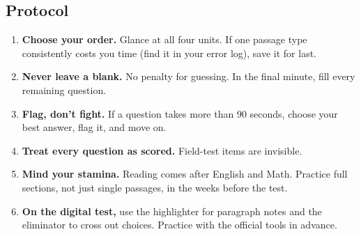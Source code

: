 \documentclass[11pt]{article}
\begin{document}
\subsection{Protocol}
\begin{enumerate}
  \item \textbf{Choose your order.} Glance at all four units. If one passage type consistently costs you time (find it in your error log), save it for last.
  \item \textbf{Never leave a blank.} No penalty for guessing. In the final minute, fill every remaining question.
  \item \textbf{Flag, don't fight.} If a question takes more than 90 seconds, choose your best answer, flag it, and move on.
  \item \textbf{Treat every question as scored.} Field-test items are invisible.
  \item \textbf{Mind your stamina.} Reading comes after English and Math. Practice full sections, not just single passages, in the weeks before the test.
  \item \textbf{On the digital test,} use the highlighter for paragraph notes and the eliminator to cross out choices. Practice with the official tools in advance.
\end{enumerate}

\end{document}
